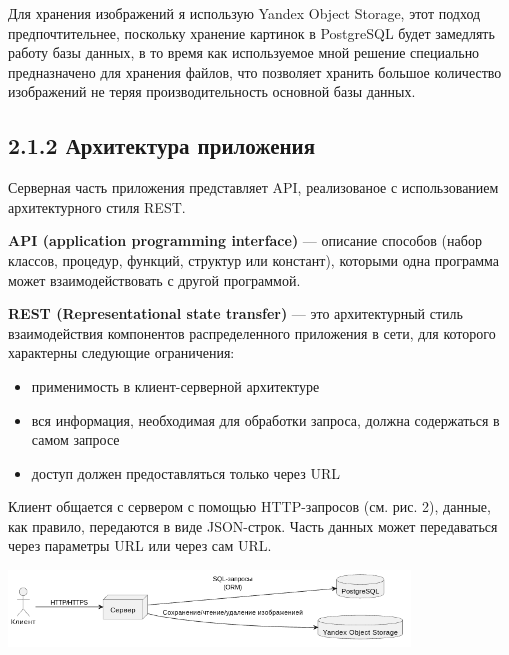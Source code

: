 \documentclass[14pt]{extarticle}
\begin{document}
\bigskip

Для хранения изображений я использую Yandex Object Storage,
этот подход предпочтительнее, поскольку хранение картинок в PostgreSQL
будет замедлять работу базы данных, в то время как используемое мной решение
специально предназначено для хранения файлов, что позволяет хранить большое количество
изображений не теряя производительность основной базы данных.

\subsection{2.1.2 Архитектура приложения}

\bigskip

Серверная часть приложения представляет API,
реализованое с использованием архитектурного стиля REST.

\bigskip

\textbf{API (application programming interface)} --- описание способов (набор
классов, процедур, функций, структур или констант), которыми одна
программа может взаимодействовать с другой программой.

\bigskip

\textbf{REST (Representational state transfer)} --- это архитектурный стиль
взаимодействия компонентов распределенного приложения в сети, для
которого характерны следующие ограничения:
\begin{itemize}
    \item применимость в клиент-серверной архитектуре
    \item вся информация, необходимая для обработки запроса, должна
        содержаться в самом запросе
    \item доступ должен предоставляться только через URL
\end{itemize}

\bigskip

Клиент общается с сервером с помощью HTTP-запросов (см. рис. 2),
данные, как правило, передаются в виде JSON-строк.
Часть данных может передаваться через параметры URL или через сам URL.

\begin{center}
    \includegraphics[width=0.8\textwidth]{client-server.png}
\end{center}
\end{document}
